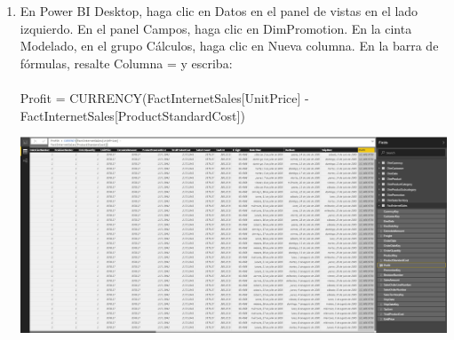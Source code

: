 \begin{enumerate}[1.]
	\item En Power BI Desktop, haga clic en Datos en el panel de vistas en el lado izquierdo. En el panel Campos, haga clic en DimPromotion.  En la cinta Modelado, en el grupo Cálculos, haga clic en Nueva columna. En la barra de fórmulas, resalte Columna = y escriba:
	\\
	\\Profit = CURRENCY(FactInternetSales[UnitPrice] - \\
FactInternetSales[ProductStandardCost])\\
			 
	\begin{center}
	\includegraphics[width=17cm]{./Imagenes/38} 
	\end{center}

\end{enumerate}



